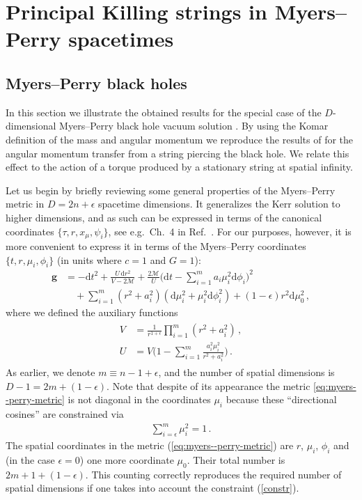 \documentclass[superscriptaddress,twocolumn,showpacs,
preprintnumbers,amsmath,amssymb,nofootinbib,
longbibliography,aps,prd,10pt]{revtex4-1}
\newcommand{\ts}[1]{{\boldsymbol{#1}}}         %
\newcommand{\dd}{\mbox{d}}
\newcommand{\n}[1]{\label{#1}}
\begin{document}
\section{Principal Killing strings in Myers--Perry spacetimes}
\label{sec:myers-perry}

\subsection{Myers--Perry black holes}
In this section we illustrate the obtained results for the special case of the $D$-dimensional Myers--Perry black hole vacuum solution \cite{Myers:1986un,Myers:2011yc}. By using the Komar definition of the mass and angular momentum we reproduce the results of \cite{Frolov:2004qw} for the angular momentum transfer from a string piercing the black hole. We relate this effect to the action of a torque produced by a stationary string at spatial infinity.

Let us begin by briefly reviewing some general properties of the Myers--Perry metric in $D = 2n + \epsilon$ spacetime dimensions. It generalizes the Kerr solution to higher dimensions, and as such can be expressed in terms of the canonical coordinates $\{\tau, r, x{}_\mu,\psi_i \}$, see e.g.\ Ch.~4 in Ref.~\cite{Frolov:2017kze}. For our purposes, however, it is more convenient to express it in terms of the Myers--Perry coordinates $\{t, r, \mu_i, \phi_i\}$ (in units where $c=1$ and $G=1$):
\begin{align}
\ts{g} &= -\dd t^2 + \frac{U \, \dd r^2}{V - 2\mathcal{M}} + \frac{2\mathcal{M}}{U}\bigg( \dd t - \sum\limits_{i=1}^m a_i \mu_i^2 \dd \phi_i \bigg)^2 \label{eq:myers--perry-metric} \\
&\hspace{12pt} + \sum\limits_{i=1}^m \left(r^2+a_i^2\right)\left(\dd\mu_i^2 + \mu_i^2 \dd \phi_i^2\right) + (1-\epsilon) r^2 \dd \mu_0^2 \, , \nonumber
\end{align}
where we defined the auxiliary functions
\begin{align}
\begin{split}
V &= \frac{1}{r^{1+\epsilon}} \prod\limits_{i=1}^m \left(r^2 + a_i^2\right)\, , \\
U &= V\bigg(1 - \sum\limits_{i=1}^m \frac{a_i^2\mu_i^2}{r^2 + a_i^2} \bigg) \, .
\end{split}
\end{align}
As earlier, we denote $m \equiv n - 1 + \epsilon$, and the number of spatial dimensions is $D-1=2m+(1-\epsilon)$. Note that despite of its appearance the metric \eqref{eq:myers--perry-metric} is not diagonal in the coordinates $\mu_i$ because these ``directional cosines'' are constrained via
\begin{align}\n{constr}
\sum\limits_{i=\epsilon}^m \mu_i^2 = 1 \, .
\end{align}
The spatial coordinates in the metric (\ref{eq:myers--perry-metric}) are $r$, $\mu_i$, $\phi_i$ and (in the case $\epsilon=0$) one more coordinate $\mu_0$. Their total number is $2m+1+(1-\epsilon)$. This counting correctly reproduces the required number of spatial dimensions if one takes into account the constraint (\ref{constr}).
\end{document}
